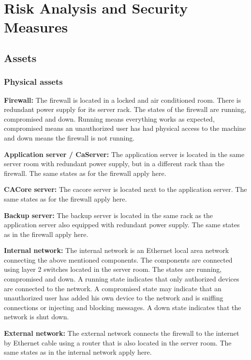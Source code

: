 \documentclass[english]{article}
\begin{document}
\section{Risk Analysis and Security Measures}

\subsection{Assets}

\subsubsection{Physical assets}

	\begin{description}
		\item{\textbf{Firewall:}} The firewall is located in a locked and air conditioned room. There is redundant power supply for its server rack. The states of the firewall are running, compromised and down. Running means everything works as expected, compromised means an unauthorized user has had physical access to the machine and down means the firewall is not running.
		\item{\textbf{Application server / CaServer:}} The application server is located in the same server room with redundant power supply, but in a different rack than the firewall. The same states as for the firewall apply here.
		\item{\textbf{CACore server:}} The cacore server is located next to the application server. The same states as for the firewall apply here.
		\item{\textbf{Backup server:}} The backup server is located in the same rack as the application server also equipped with redundant power supply. The same states as in the firewall apply here.
		\item{\textbf{Internal network:}} The internal network is an Ethernet local area network connecting the above mentioned components. The components are connected using layer 2 switches located in the server room. The states are running, compromised and down. A running state indicates that only authorized devices are connected to the network. A compromised state may indicate that an unauthorized user has added his own device to the network and is sniffing connections or injecting and blocking messages. A down state indicates that the network is shut down.
		\item{\textbf{External network:}} The external network connects the firewall to the internet by Ethernet cable using a router that is also located in the server room. The same states as in the internal network apply here.
	\end{description}
\end{document}
